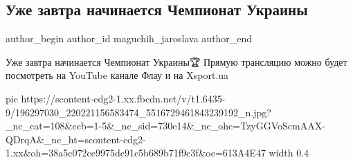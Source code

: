  
 
 
 
 
 
\subsection{Уже завтра начинается Чемпионат Украины}
\label{sec:17_06_2021.fb.maguchih_jaroslava.1.chempionat_ukrainy}
 
\ifcmt
 author_begin
   author_id maguchih_jaroslava
 author_end
\fi

Уже завтра начинается Чемпионат Украины🏆 Прямую трансляцию можно будет
посмотреть на YouTube канале Флау и на Xsport.ua

\ifcmt
  pic https://scontent-cdg2-1.xx.fbcdn.net/v/t1.6435-9/196297030_220221156583474_5516729461843239192_n.jpg?_nc_cat=108&ccb=1-5&_nc_sid=730e14&_nc_ohc=TzyGGVoScmAAX-QDrqA&_nc_ht=scontent-cdg2-1.xx&oh=38a5c072ce9975dc91c5b689b71f9c3f&oe=613A4E47
  width 0.4
\fi

